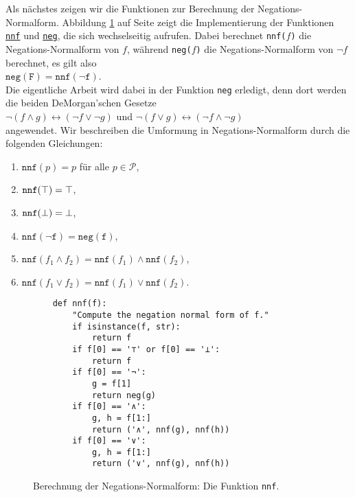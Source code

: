 Als nächstes zeigen wir die Funktionen zur Berechnung der Negations-Normalform.
Abbildung
\ref{fig:nnf} auf Seite \pageref{fig:nnf} zeigt die Implementierung der Funktionen
\href{https://github.com/karlstroetmann/Logic/blob/master/Python/CNF.ipynb}{\texttt{nnf}} und
\href{https://github.com/karlstroetmann/Logic/blob/master/Python/CNF.ipynb}{\texttt{neg}},
die sich wechselseitig aufrufen.  Dabei berechnet \texttt{nnf($f$)} die Negations-Normalform von $f$, während  
\texttt{neg($f$)} die Negations-Normalform von $\neg f$ berechnet,  es gilt also
\\[0.2cm]
\hspace*{1.3cm}
$\texttt{neg}(\texttt{F}) = \texttt{nnf}(\neg \texttt{f})$.
\\[0.2cm]
 Die eigentliche Arbeit wird dabei in der
Funktion \texttt{neg} erledigt, denn dort werden die beiden DeMorgan'schen Gesetze 
\\[0.2cm]
\hspace*{1.3cm}
$\neg (f \wedge g) \leftrightarrow (\neg f \vee \neg g)$ \quad und \quad 
$\neg (f \vee g) \leftrightarrow (\neg f \wedge \neg g)$ 
\\[0.2cm]
angewendet.  Wir beschreiben die Umformung in Negations-Normalform durch 
die folgenden Glei\-chungen: 
\begin{enumerate}
\item $\texttt{nnf}(p) = p$ \quad für alle $p \in \mathcal{P}$,
\item $\texttt{nnf}(\top) = \top$,
\item $\texttt{nnf}(\bot) = \bot$,
\item $\texttt{nnf}(\neg \texttt{f}) = \texttt{neg}(\texttt{f})$,
\item $\texttt{nnf}(f_1 \wedge f_2) = \texttt{nnf}(f_1) \wedge \texttt{nnf}(f_2)$,
\item $\texttt{nnf}(f_1 \vee f_2) = \texttt{nnf}(f_1) \vee \texttt{nnf}(f_2)$.
\end{enumerate}

\begin{figure}[!ht]
  \centering
\begin{verbatim}
    def nnf(f):
        "Compute the negation normal form of f."
        if isinstance(f, str): 
            return f
        if f[0] == '⊤' or f[0] == '⊥':
            return f
        if f[0] == '¬':
            g = f[1]
            return neg(g)
        if f[0] == '∧':
            g, h = f[1:]
            return ('∧', nnf(g), nnf(h))
        if f[0] == '∨':
            g, h = f[1:]
            return ('∨', nnf(g), nnf(h))

\end{verbatim}
\vspace*{-0.3cm}
  \caption{Berechnung der Negations-Normalform: Die Funktion \texttt{nnf}.}
  \label{fig:nnf}
\end{figure}

